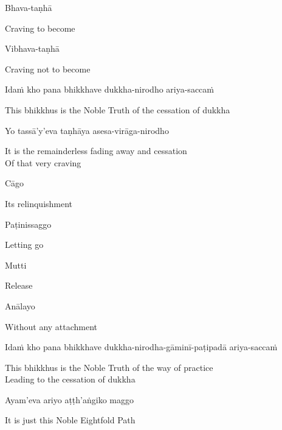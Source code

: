 Bhava-taṇhā

\begin{english}
  Craving to become
\end{english}

Vibhava-taṇhā

\begin{english}
  Craving not to become
\end{english}

Idaṁ kho pana bhikkhave dukkha-nirodho ariya-saccaṁ

\begin{english}
  This bhikkhus is the Noble Truth of the cessation of dukkha
\end{english}

Yo tassā'y'eva taṇhāya asesa-virāga-nirodho

\begin{english}
  It is the remainderless fading away and cessation\\
  Of that very craving
\end{english}

Cāgo

\begin{english}
  Its relinquishment
\end{english}

Paṭinissaggo

\begin{english}
  Letting go
\end{english}

Mutti

\begin{english}
  Release
\end{english}

Anālayo

\begin{english}
  Without any attachment
\end{english}

\begin{pali-hang}
  Idaṁ kho pana bhikkhave dukkha-nirodha-gāminī-paṭipadā ariya-saccaṁ
\end{pali-hang}

\begin{english}
  This bhikkhus is the Noble Truth of the way of practice\\
  Leading to the cessation of dukkha
\end{english}

Ayam'eva ariyo aṭṭh'aṅgiko maggo

\begin{english}
  It is just this Noble Eightfold Path
\end{english}


